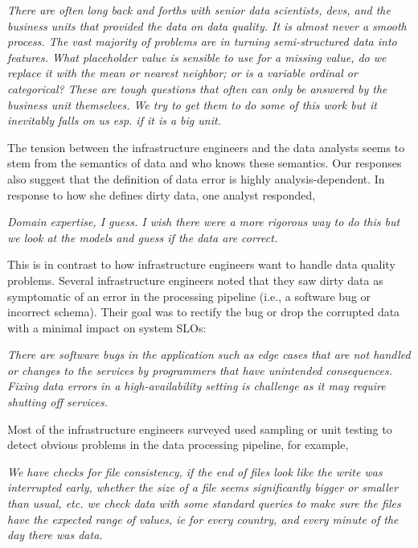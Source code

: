 \vspace{0.5em}
\emph{There are often long back and forths with senior data scientists, devs, and the business units that provided the data on data quality. It is almost never a smooth process. The vast majority of problems are in turning semi-structured data into features. What placeholder value is sensible to use for a missing value, do we replace it with the mean or nearest neighbor; or is a variable ordinal or categorical? These are tough questions that often can only be answered by the business unit themselves. We try to get them to do some of this work but it inevitably falls on us esp. if it is a big unit.}

\vspace{0.5em}

The tension between the infrastructure engineers and the data analysts seems to stem from the semantics of data and who knows these semantics. Our responses also suggest that the definition of data error is highly analysis-dependent. In response to how she defines dirty data, one analyst responded,

\vspace{0.5em}
\emph{Domain expertise, I guess. I wish there were a more rigorous way to do this but we look at the models and guess if the data are correct.}

\vspace{0.5em}

This is in contrast to how infrastructure engineers want to handle data quality problems. 
Several infrastructure engineers noted that they saw dirty data as symptomatic of an error in the processing pipeline (i.e., a software bug or incorrect schema). Their goal was to rectify the bug or drop the corrupted data with a minimal impact on system SLOs:

\vspace{0.5em}
\emph{There are software bugs in the application such as edge cases that are not handled or changes to the services by programmers that have unintended consequences. Fixing data errors in a high-availability setting is challenge as it may require shutting off services.}

\vspace{0.5em}

Most of the infrastructure engineers surveyed used sampling or unit testing to detect obvious problems in the data processing pipeline, for example,

\vspace{0.5em}
\emph{We have checks for file consistency, if the end of files look like the write was interrupted early, whether the size of a file seems significantly bigger or smaller than usual, etc. we check data with some standard queries to make sure the files have the expected range of values, ie for every country, and every minute of the day there was data.}

